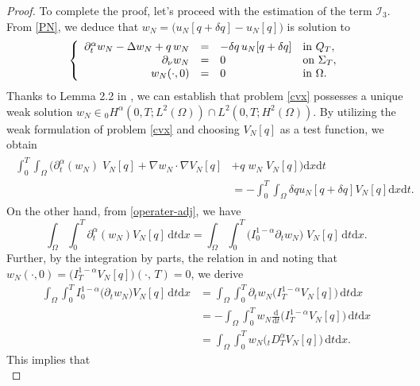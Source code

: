 \documentclass[a4paper,12pt,reqno,natbib]{amsart}
\newcommand{\dx} {\displaystyle\mathrm{d}x}
\newcommand{\dt} {\displaystyle\mathrm{d}t}
\begin{document}
{\begin{proof}
To complete the proof, let's proceed with the estimation of the term $\mathcal{I}_3.$ From \eqref{PN}, we deduce that $w_N=\Big( u_N[q+\delta q]- u_N[q]\Big)$ is solution to
\begin{eqnarray} \label{cvx} 
\left\{
  \begin{array}{rcll}
    \partial_{t} ^{\alpha} w_N-\Delta w_N +q\, w_N&=& -\delta q\, u_N [q+\delta q] &\hbox{in}\ Q_T, \\
    \partial_\nu w_N &=&0 &\hbox{on}\  \Sigma_T, \\
    \displaystyle w_N(\cdot,0)&=&0  &\hbox{in}\ \Omega.
  \end{array}
\right.
\end{eqnarray}
Thanks to Lemma 2.2 in \cite{jiang2020numerical}, we can establish that problem \eqref{cvx} possesses a unique weak solution $w_N\in {}_0H^\alpha(0,T;L^2(\Omega))\cap L^2(0,T;H^2(\Omega))$. By utilizing the weak formulation of problem \eqref{cvx} and choosing $V_N[q]$ as a test function, we obtain
\begin{align}
\begin{split}\label{adjoint2}
\int_0^T\int_{\Omega}\Big(
\partial_t^\alpha (w_N)\;V_N[q] +
\nabla w_N\cdot\nabla V_N[q] &+ q\;w_N\;V_N[q] \Big)\dx \dt
\\
&=-\int_0^T\int_{\Omega}
\delta q u_N[q+\delta q]V_N[q] \dx \dt.
\end{split}
\end{align}
On the other hand, from \eqref{operater-adj}, we have
\begin{equation*}%
    \int_{\Omega} \int_0^{T} \partial_t^\alpha (w_N)V_N[q]\,\dt\dx =\int_{\Omega} \int_0^{T} \Big(I_{0}^{1-\alpha}\partial_t w_N\Big)\; V_N[q]\,\dt\dx. 
\end{equation*}
Further, by the integration by parts, the relation in \cite[Lemma 4.1]{jiang2017weak} and noting that $w_N(\cdot,0)=\big(I^{1-\alpha}_TV_N[q]\big)(\cdot,\,T)=0$, we derive
\begin{align*}
\int_{\Omega} \int_0^{T} I_{0}^{1-\alpha}\Big( \partial_t w_N\Big) V_N[q]\,\dt\dx& =\int_{\Omega} \int_0^{T} \partial_t w_N \big(I_{T}^{1-\alpha} V_N[q]\big)\, \dt\dx \\
& =-\int_{\Omega} \int_0^{T} w_N \frac{\mathrm{d}}{\mathrm{d} t} \big(I_{T}^{1-\alpha} V_N[q]\big)\, \dt\dx \\
& =\int_{\Omega} \int_0^{T} w_N \Big( {}_tD^{\alpha}_T  V_N[q]\Big)\, \dt\dx.
\end{align*}
This implies that
\begin{equation} \label{int_partie}

\end{equation}
\end{proof}}
\end{document}
